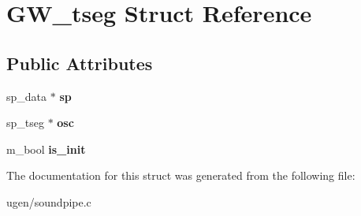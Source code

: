 \hypertarget{structGW__tseg}{}\section{G\+W\+\_\+tseg Struct Reference}
\label{structGW__tseg}
\subsection*{Public Attributes}
\begin{DoxyCompactItemize}
\item 
\hypertarget{structGW__tseg_ac775fcbf427e4ed6819f35aa6223ef4a}{}\label{structGW__tseg_ac775fcbf427e4ed6819f35aa6223ef4a} 
sp\+\_\+data $\ast$ {\bfseries sp}
\item 
\hypertarget{structGW__tseg_af18ab0f1cf84204a6a61e1ed9bdbcbae}{}\label{structGW__tseg_af18ab0f1cf84204a6a61e1ed9bdbcbae} 
sp\+\_\+tseg $\ast$ {\bfseries osc}
\item 
\hypertarget{structGW__tseg_a415155fcaedad1ba7c261a045241ac80}{}\label{structGW__tseg_a415155fcaedad1ba7c261a045241ac80} 
m\+\_\+bool {\bfseries is\+\_\+init}
\end{DoxyCompactItemize}


The documentation for this struct was generated from the following file\+:\begin{DoxyCompactItemize}
\item 
ugen/soundpipe.\+c\end{DoxyCompactItemize}

